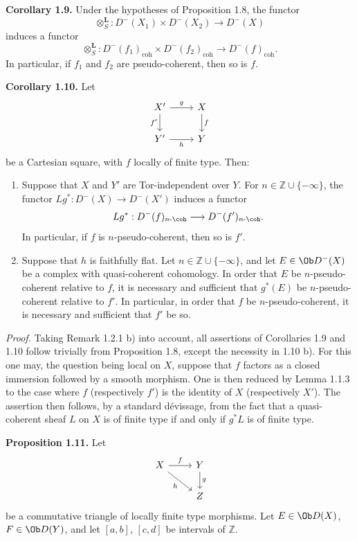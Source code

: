 \textbf{Corollary 1.9.} Under the hypotheses of Proposition 1.8, the functor
\[
  \otimes_S^{\mathbf L}:D^{-}(X_1)\times D^{-}(X_2)\longrightarrow D^{-}(X)
\]
induces a functor
\[
  \otimes_S^{\mathbf L}:D^{-}(f_1)_{\mathrm{coh}}\times D^{-}(f_2)_{\mathrm{coh}}
  \longrightarrow D^{-}(f)_{\mathrm{coh}} .
\]
In particular, if \(f_1\) and \(f_2\) are pseudo-coherent, then so is \(f\).

\textbf{Corollary 1.10.} Let
\[
\begin{tikzcd}
X' \arrow[r,"g"] \arrow[d,"f'"'] & X \arrow[d,"f"]\\
Y' \arrow[r,"h"'] & Y
\end{tikzcd}
\]
be a Cartesian square, with \(f\) locally of finite type. Then:
\begin{enumerate}[label=\alph*)]
\item Suppose that \(X\) and \(Y'\) are Tor-independent over \(Y\). For \(n\in\mathbb Z\cup\{-\infty\}\), the functor \(Lg^*:D^{-}(X)\to D^{-}(X')\) induces a functor
\[
  Lg^*:D^{-}(f)_{n\text{-}\coh}\longrightarrow D^{-}(f')_{n\text{-}\coh}.
\]
In particular, if \(f\) is \(n\)-pseudo-coherent, then so is \(f'\).

\item Suppose that \(h\) is faithfully flat. Let \(n\in\mathbb Z\cup\{-\infty\}\), and let \(E\in\Ob D^{-}(X)\) be a complex with quasi-coherent cohomology. In order that \(E\) be \(n\)-pseudo-coherent relative to \(f\), it is necessary and sufficient that \(g^*(E)\) be \(n\)-pseudo-coherent relative to \(f'\). In particular, in order that \(f\) be \(n\)-pseudo-coherent, it is necessary and sufficient that \(f'\) be so.
\end{enumerate}

\emph{Proof.} Taking Remark 1.2.1 b) into account, all assertions of Corollaries 1.9 and 1.10 follow trivially from Proposition 1.8, except the necessity in 1.10 b). For this one may, the question being local on \(X\), suppose that \(f\) factors as a closed immersion followed by a smooth morphism. One is then reduced by Lemma 1.1.3 to the case where \(f\) (respectively \(f'\)) is the identity of \(X\) (respectively \(X'\)). The assertion then follows, by a standard dévissage, from the fact that a quasi-coherent sheaf \(L\) on \(X\) is of finite type if and only if \(g^*L\) is of finite type.

\textbf{Proposition 1.11.} Let
\[
\begin{tikzcd}
X \arrow[r,"f"] \arrow[dr,"h"'] & Y \arrow[d,"g"]\\
& Z
\end{tikzcd}
\]
be a commutative triangle of locally finite type morphisms. Let \(E\in\Ob D(X)\), \(F\in\Ob D(Y)\), and let \([a,b]\), \([c,d]\) be intervals of \(\mathbb Z\).

